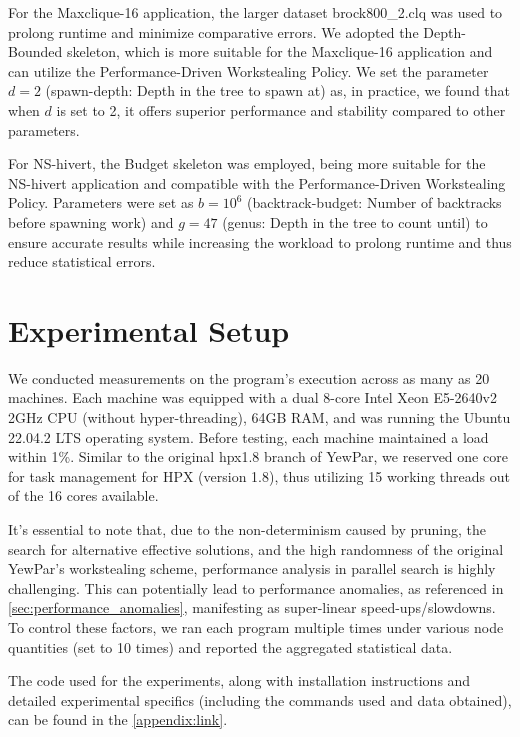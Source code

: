 \documentclass{mproj}
\begin{document}
For the Maxclique-16 application, the larger dataset brock800\_2.clq was used to prolong runtime and minimize comparative errors.
We adopted the Depth-Bounded skeleton, which is more suitable for the Maxclique-16 application and can utilize the Performance-Driven Workstealing Policy.
We set the parameter \(d = 2\) (spawn-depth: Depth in the tree to spawn at) as, in practice, we found that when \(d\) is set to 2, it offers superior performance and stability compared to other parameters.

For NS-hivert, the Budget skeleton was employed, being more suitable for the NS-hivert application and compatible with the Performance-Driven Workstealing Policy.
Parameters were set as \(b = 10^6\) (backtrack-budget: Number of backtracks before spawning work) and \(g = 47\) (genus: Depth in the tree to count until) to ensure accurate results while increasing the workload to prolong runtime and thus reduce statistical errors.

\section{Experimental Setup}

We conducted measurements on the program's execution across as many as 20 machines.
Each machine was equipped with a dual 8-core Intel Xeon E5-2640v2 2GHz CPU (without hyper-threading),
64GB RAM, and was running the Ubuntu 22.04.2 LTS operating system.
Before testing, each machine maintained a load within 1\%.
Similar to the original hpx1.8 branch of YewPar, we reserved one core for task management for HPX (version 1.8),
thus utilizing 15 working threads out of the 16 cores available.

It's essential to note that, due to the non-determinism caused by pruning, the search for alternative effective solutions, and the high randomness of the original YewPar's workstealing scheme,
performance analysis in parallel search is highly challenging.
This can potentially lead to performance anomalies, as referenced in \cref{sec:performance_anomalies},
manifesting as super-linear speed-ups/slowdowns.
To control these factors,
we ran each program multiple times under various node quantities (set to 10 times)
and reported the aggregated statistical data.

The code used for the experiments,
along with installation instructions and detailed experimental specifics (including the commands used and data obtained),
can be found in the \cref{appendix:link}.
\end{document}
